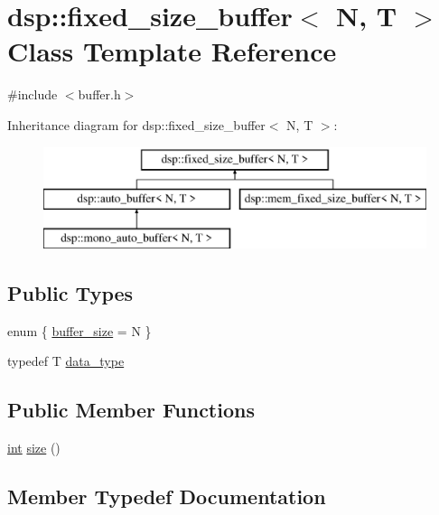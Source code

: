 \hypertarget{classdsp_1_1fixed__size__buffer}{}\section{dsp\+:\+:fixed\+\_\+size\+\_\+buffer$<$ N, T $>$ Class Template Reference}
\label{classdsp_1_1fixed__size__buffer}


{\ttfamily \#include $<$buffer.\+h$>$}

Inheritance diagram for dsp\+:\+:fixed\+\_\+size\+\_\+buffer$<$ N, T $>$\+:\begin{figure}[H]
\begin{center}
\leavevmode
\includegraphics[height=3.000000cm]{classdsp_1_1fixed__size__buffer}
\end{center}
\end{figure}
\subsection*{Public Types}
\begin{DoxyCompactItemize}
\item 
enum \{ \hyperlink{classdsp_1_1fixed__size__buffer_a200b23db4a04ad08b4a70a92c968b926adac6e851d4004a6f36b7047c2e026ca7}{buffer\+\_\+size} = N
 \}
\item 
typedef T \hyperlink{classdsp_1_1fixed__size__buffer_af51fc2bdaf146ea493c21079f8c7f491}{data\+\_\+type}
\end{DoxyCompactItemize}
\subsection*{Public Member Functions}
\begin{DoxyCompactItemize}
\item 
\hyperlink{tk_8h_a83f82f76e7fed06f4c49d2db94028a6d}{int} \hyperlink{classdsp_1_1fixed__size__buffer_ab06273b70b7382769e58f6ff6c998808}{size} ()
\end{DoxyCompactItemize}


\subsection{Member Typedef Documentation}
